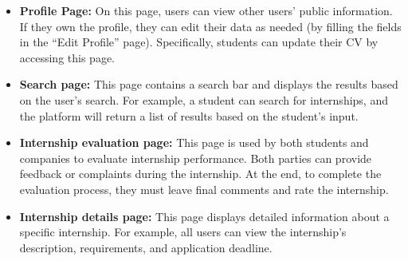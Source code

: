 \begin{itemize}
    \item \textbf{Profile Page:} On this page, users can view other users' public information. If they own the profile, they can edit their data 
    as needed (by filling the fields in the ``Edit Profile'' page). Specifically, students can update their CV by accessing this page.

    \item \textbf{Search page:} This page contains a search bar and displays the results based on the user's search. For example, a student
    can search for internships, and the platform will return a list of results based on the student's input. 
    
    \item \textbf{Internship evaluation page:} This page is used by both students and companies to evaluate internship performance. Both 
    parties can provide feedback or complaints during the internship. At the end, to complete the evaluation process, they must leave
    final comments and rate the internship.

    \item \textbf{Internship details page:} This page displays detailed information about a specific internship. For example, all users can
    view the internship's description, requirements, and application deadline.

\end{itemize}

